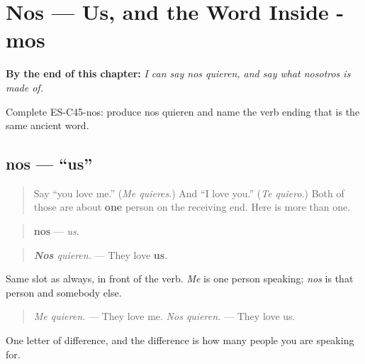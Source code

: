 
\chapter{Nos --- Us, and the Word Inside -mos}
\label{ch:pronoun-nos}

\begin{chapteropening}
\textbf{By the end of this chapter:} \emph{I can say nos quieren, and say what nosotros is made of.}

Complete ES-C45-nos: produce nos quieren and name the verb ending that is the same ancient word.
\end{chapteropening}

\section[nos]{nos — \textquotedblleft{}us\textquotedblright{}}

\label{lesson:ES-C45-nos}



\begin{quote}
Say \textquotedblleft{}you love me.\textquotedblright{} (\emph{Me quieres}.) And \textquotedblleft{}I love you.\textquotedblright{} (\emph{Te quiero}.) Both of those are about \textbf{one} person on the receiving end. Here is more than one.
\end{quote}

\begin{grammarlens}[title={Grammar Lens: the third person in the room}]
\begin{quote}
\textbf{nos} — \emph{us}.
\end{quote}

\begin{quote}
\emph{\textbf{Nos} quieren.} — They love \textbf{us}.
\end{quote}

Same slot as always, in front of the verb. \emph{Me} is one person speaking; \emph{nos} is that person and somebody else.

\begin{quote}
\emph{Me quieren.} — They love me. \emph{Nos quieren.} — They love us.
\end{quote}

One letter of difference, and the difference is how many people you are speaking for.
\end{grammarlens}


